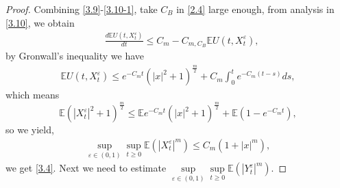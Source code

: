 \documentclass[11pt,reqno]{amsart}
\numberwithin{equation}{section}
\begin{document}
\begin{proof}
Combining \eqref{3.9}-\eqref{3.10-1}, take $C_B$ in \eqref{2.4} large enough, from analysis in \eqref{3.10}, we obtain
	\begin{align*}
			&\frac{d\mathbb{E}U(t,X_{t}^{\varepsilon})}{dt}\leq C_{m}-C_{m,C_B}\mathbb{E}U(t,X_{t}^{\varepsilon}),
	\end{align*}
	by Gronwall's inequality we have 
	\begin{align*}
		\mathbb{E}U(t,X_{t}^{\varepsilon})\leq e^{-C_{m}t}(|x|^{2}+1)^{\frac{m}{2}}+C_{m}\int^{t}_{0}e^{-C_{m}(t-s)}ds,
	\end{align*}
	which means
	$$\mathbb{E}(|X_{t}^{\varepsilon}|^{2}+1)^{\frac{m}{2}}\leq \mathbb{E}e^{-C_{m}t}(|x|^{2}+1)^{\frac{m}{2}}+\mathbb{E}(1-e^{-C_{m}t}),$$
	so we yield, 
	\begin{align*}
			\sup\limits_{\varepsilon\in (0,1)}\sup\limits_{t\geq0} \mathbb{E}\left(|X_{t}^{\varepsilon}|^{m}\right)\leq C_{m}(1+|x|^{m}),
	\end{align*}
	we get \eqref{3.4}. Next we need to estimate $\sup\limits_{\varepsilon\in (0,1)}\sup\limits_{t\geq0}\mathbb{E}\left(|Y_{t}^{\varepsilon}|^{m}\right) $.
	

\end{proof}
\end{document}
